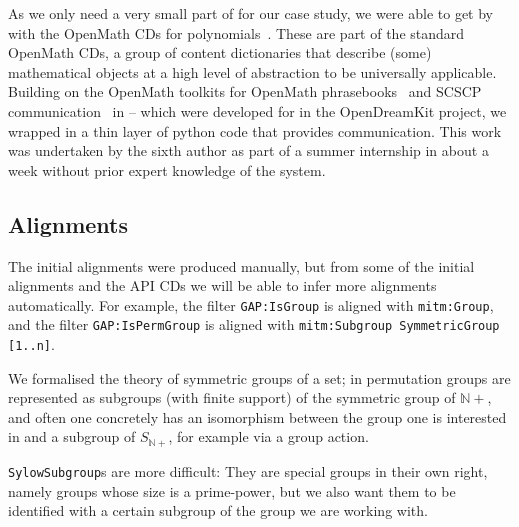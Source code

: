 As we only need a very small part of \Singular for our case study, we were able to get by
with the OpenMath CDs for polynomials~\cite{OMCD:poly:on}. These are part of the standard
OpenMath CDs, a group of content dictionaries that describe (some) mathematical objects at
a high level of abstraction to be universally applicable. Building on the OpenMath
toolkits for OpenMath phrasebooks~\cite{py-openmath:on} and SCSCP
communication~\cite{py-scscp:on} in \Python -- which were developed for \Sage in the
OpenDreamKit project, we wrapped \Singular in a thin layer of python code that provides
\SCSCP communication. This work was undertaken by the sixth author as part of a summer
internship in about a week without prior expert knowledge of the system.

\subsection{Alignments}

The initial alignments were produced manually, but from some of the initial alignments
and the \GAP API CDs we will be able to infer more alignments automatically.  For example,
the filter \texttt{GAP:IsGroup} is aligned with
\texttt{mitm:Group}, and the filter \texttt{GAP:IsPermGroup} is aligned with
\texttt{mitm:Subgroup SymmetricGroup [1..n]}.  

We formalised the theory of symmetric groups of a set; in \GAP permutation groups
are represented as subgroups (with finite support) of the symmetric group of
$\mathbb{N}+$, and often one concretely has an isomorphism between the group one
is interested in and a subgroup of $S_{\mathbb{N}+}$, for example
via a group action.

\texttt{SylowSubgroup}s are more difficult: They are special groups in their
own right, namely groups whose size is a prime-power, but we also want them
to be identified with a certain subgroup of the group we are working
with.

